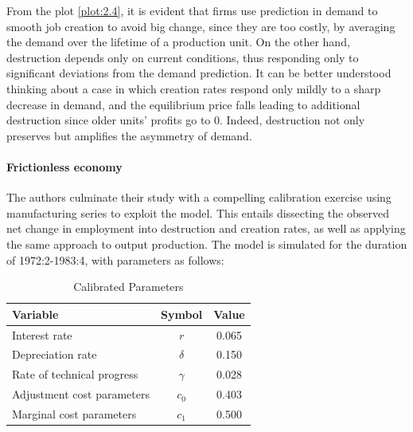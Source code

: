 \documentclass[12pt]{report}
\begin{document}
From the plot \ref{plot:2.4}, it is evident that firms use prediction in demand to smooth job creation to avoid
big change, since they are too costly, by averaging the demand over the lifetime of a production unit. On the other
hand, destruction depends only on current conditions, thus responding only to significant deviations from the demand
prediction. It can be better understood thinking about a case in which creation rates respond only mildly to a sharp
decrease in demand, and the equilibrium price falls leading to additional destruction since older units' profits go to 0.
Indeed, destruction not only preserves but amplifies the asymmetry of demand.\paragraph{Frictionless economy}
\par
The authors culminate their study with a compelling calibration exercise using manufacturing series to exploit the
model. This entails dissecting the observed net change in employment into destruction and creation rates, as well as
applying the same approach to output production. The model is simulated for the duration of 1972:2-1983:4, with
parameters as follows: 


\begin{table}[ht]
    \centering
    \caption{Calibrated Parameters}
    \label{Tab2.1}
    \begin{tabular}{lcc}
    \hline
    Variable & Symbol & Value \\
    \hline
    Interest rate & $r$ & 0.065 \\
    Depreciation rate & $\delta$ & 0.150 \\
    Rate of technical progress & $\gamma$ & 0.028 \\
    Adjustment cost parameters & $c_0$ & 0.403 \\
    Marginal cost parameters& $c_1$ & 0.500 \\
    \hline
    \end{tabular}
    \end{table}
    
\end{document}
